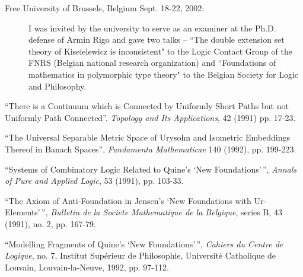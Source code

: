 \begin{description}
\begin{description}
\item[Free University of Brussels, Belgium Sept. 18-22, 2002:]  I was invited by the university to serve as an examiner at the Ph.D. defense of Armin Rigo and gave two talks -- ``The double extension set theory of Kiseielewicz is inconsistent" to the Logic Contact Group of the FNRS (Belgian national research organization) and ``Foundations of mathematics in polymorphic type theory" to the Belgian Society for Logic and Philosophy.







\end{description}



\newpage

        \item [List of Publications] \begin{description} \item
        \item[1.] ``There is a Continuum which is Connected by
        Uniformly Short Paths but not Uniformly Path Connected''.
        {\em Topology and Its Applications}, 42 (1991) pp. 17-23.
        \item[2.] ``The Universal Separable Metric Space of Urysohn
        and Isometric Embeddings Thereof in Banach Spaces'', {\em
        Fundamenta Mathematicae} 140 (1992), pp. 199-223.  \item[3.]
        ``Systems of Combinatory Logic Related to Quine's `New
        Foundations'\,'', {\em Annals of Pure and Applied Logic}, 53
        (1991), pp. 103-33.  \item[4.] ``The Axiom of Anti-Foundation
        in Jensen's `New Foundations with Ur-Elements'\,'', {\em
        Bulletin de la Societe Mathematique de la Belgique}, series B,
        43 (1991), no. 2, pp. 167-79.  \item[5.] ``Modelling Fragments
        of Quine's `New Foundations'\,'', {\em Cahiers du Centre de
        Logique}, no.  7, Institut Sup\'{e}rieur de Philosophie,
        Universit\'{e} Catholique de Louvain, Louvain-la-Neuve, 1992,
        pp. 97-112.


\end{description}
\end{description}
